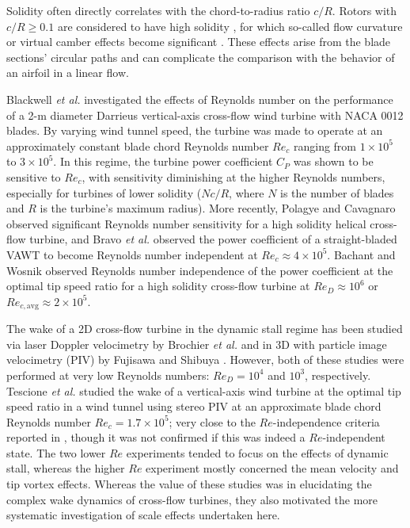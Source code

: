 \documentclass[energies,article,accept,moreauthors,pdftex,10pt,a4paper]{mdpi}
\theoremstyle{mdpi}
\newcounter{ex}
\newcounter{re}
\begin{document}
Solidity often directly correlates with the chord-to-radius ratio $c/R$. Rotors
with $c/R \ge 0.1$ are considered to have high solidity \cite{Fiedler2009}, for which
so-called flow curvature or virtual camber effects become significant
\cite{Migliore1980}. These effects arise from the blade sections' circular
paths and can complicate the comparison with the behavior of an airfoil in a linear
flow.

Blackwell \emph{et al.} \cite{Blackwell1976} investigated the effects of
Reynolds number on the performance of a 2-m diameter Darrieus vertical-axis
cross-flow wind turbine with NACA 0012 blades. By varying wind tunnel speed, the
turbine was made to operate at an approximately constant blade chord Reynolds
number $Re_c$ ranging from $1 \times 10^5$ to $3 \times 10^5$. In this regime,
the turbine power coefficient $C_P$ was shown to be sensitive to $Re_c$, with
sensitivity diminishing at the higher Reynolds numbers, especially for turbines
of lower solidity ($Nc/R$, where $N$ is the number of blades and $R$ is the
turbine's maximum radius). More recently, Polagye and Cavagnaro
\cite{Polagye2013b} observed significant Reynolds number sensitivity for a high
solidity helical cross-flow turbine, and Bravo \emph{et al.} \cite{Bravo2007}
observed the power coefficient of a straight-bladed VAWT to become Reynolds
number independent at $Re_c \approx 4 \times 10^5$. Bachant and Wosnik
\cite{Bachant2014} observed Reynolds number independence of the power
coefficient at the optimal tip speed ratio for a high solidity cross-flow
turbine at $Re_D \approx 10^6$ or $Re_{c,\mathrm{avg}} \approx 2 \times 10^5$.

The wake of a 2D cross-flow turbine in the dynamic stall regime has been
studied via laser Doppler velocimetry by Brochier \emph{et al.} \cite{Brochier1986} and
in 3D with particle image velocimetry (PIV) by Fujisawa and Shibuya
\cite{Fujisawa2001}. However, both of these studies were performed at very low
Reynolds numbers: $Re_D = 10^4$ and $10^3$, respectively. Tescione \emph{et al.}
\cite{Tescione2014} studied the wake of a vertical-axis wind turbine at the optimal
tip speed ratio in a wind tunnel using stereo PIV at an approximate blade chord
Reynolds number $Re_c = 1.7 \times 10^5$; very close to the $Re$-independence
criteria reported in \cite{Bachant2014}, though it was not confirmed if this was
indeed a $Re$-independent state. The two lower $Re$ experiments tended to focus
on the effects of dynamic stall, whereas the higher $Re$ experiment mostly
concerned the mean velocity and tip vortex effects. Whereas the value of these
studies was in elucidating the complex wake dynamics of cross-flow turbines,
they also motivated the more systematic investigation of scale effects
undertaken here.
\end{document}
